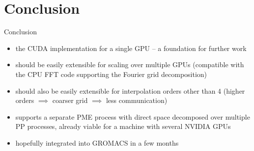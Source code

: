 \documentclass[11pt]{beamer}
\begin{document}
\section{Conclusion}

\begin{frame}{Conclusion}
\begin{itemize}
\item the CUDA implementation for a single GPU -- a foundation for further work
\item should be easily extensible for scaling over multiple GPUs
(compatible with the CPU FFT code supporting the Fourier grid decomposition)
\item should also be easily extensible for interpolation orders other than 4
(higher orders $\implies$ coarser grid $\implies$ less communication)
\item supports a separate PME process with direct space decomposed over multiple PP processes, already viable for a machine with several NVIDIA GPUs 
\item hopefully integrated into GROMACS in a few months
\end{itemize}
\end{frame}




\end{document}
